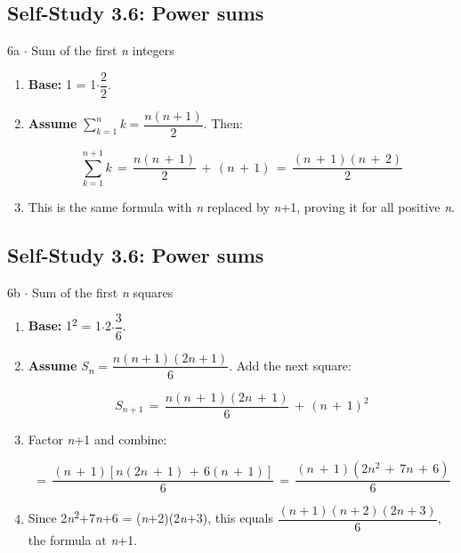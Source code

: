 \documentclass[11pt]{article}
\begin{document}
\begin{keepsection}\subsection{Self-Study 3.6: Power sums}

\begin{workedbox}{6a \ensuremath{\cdot} Sum of the first \textit{n} integers}
\begin{enumerate}
\item \textbf{Base:} 1 = 1\ensuremath{\cdot}{\small\ensuremath{\dfrac{2}{2}}}.
\item {}
\textbf{Assume} $\sum_{{k}=1}^{{n}} $\textit{k} = {\small\ensuremath{\dfrac{{n}({n}+1)}{2}}}. Then:

\begin{equation*}\sum_{{k}=1}^{{n}+1} {k}\, =\, \dfrac{{n}({n}\, +\, 1)}{2}\, +\, ({n}\, +\, 1)\, =\, \dfrac{({n}\, +\, 1)({n}\, +\, 2)}{2}\end{equation*}
\item This is the same formula with \textit{n} replaced by \textit{n}+1, proving it for all positive \textit{n}.
\end{enumerate}
\end{workedbox}

\end{keepsection}
\begin{keepsection}\subsection{Self-Study 3.6: Power sums}

\begin{workedbox}{6b \ensuremath{\cdot} Sum of the first \textit{n} squares}
\begin{enumerate}
\item \textbf{Base:} 1\textsuperscript{2} = 1\ensuremath{\cdot}2\ensuremath{\cdot}{\small\ensuremath{\dfrac{3}{6}}}.
\item {}
\textbf{Assume} \textit{S}\textsubscript{\textit{n}} = {\small\ensuremath{\dfrac{{n}({n}+1)(2{n}+1)}{6}}}. Add the next square:

\begin{equation*}{S}_{{n}+1}\, =\, \dfrac{{n}({n}\, +\, 1)(2{n}\, +\, 1)}{6}\, +\, ({n}\, +\, 1)^{2}\end{equation*}
\item {}
Factor \textit{n}+1 and combine:

\begin{equation*}=\, \dfrac{({n}\, +\, 1)[{n}(2{n}\, +\, 1)\, +\, 6({n}\, +\, 1)]}{6}\, =\, \dfrac{({n}\, +\, 1)(2{n}^{2}\, +\, 7{n}\, +\, 6)}{6}\end{equation*}
\item Since 2\textit{n}\textsuperscript{2}+7\textit{n}+6 = (\textit{n}+2)(2\textit{n}+3), this equals {\small\ensuremath{\dfrac{({n}+1)({n}+2)(2{n}+3)}{6}}}, the formula at \textit{n}+1.
\end{enumerate}
\end{workedbox}

\end{keepsection}
\end{document}
